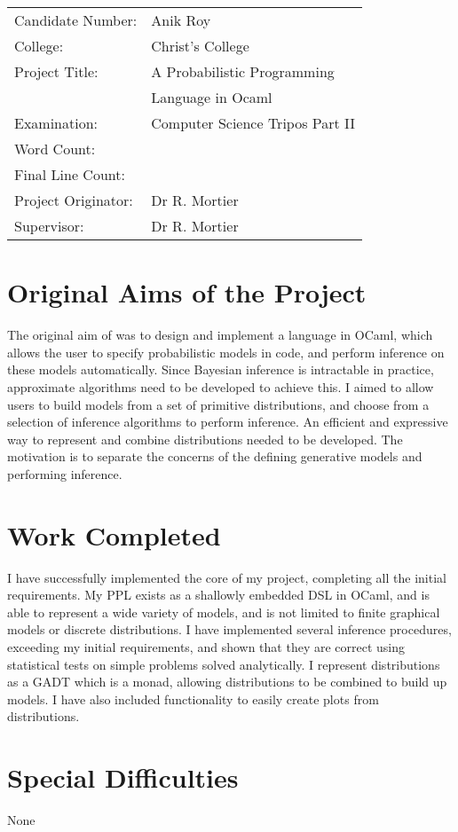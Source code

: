 \immediate{}
\immediate{}

{\large
\begin{tabular}{ll}
Candidate Number:   & Anik Roy\\
College:            & Christ's College\\
Project Title:      & A Probabilistic Programming\\
                    & Language in Ocaml\\
Examination:        & Computer Science Tripos Part II\\
Word Count:         & \footnotemark[1]\\
Final Line Count:   & \footnotemark[2]\\
Project Originator: & Dr R. Mortier\\
Supervisor:         & Dr R. Mortier\\ 
\end{tabular} 
}


\section*{Original Aims of the Project}

The original aim of was to design and implement a language in OCaml, which allows the user to specify probabilistic models in code, and perform inference on these models automatically. Since Bayesian inference is intractable in practice, approximate algorithms need to be developed to achieve this. I aimed to allow users to build models from a set of primitive distributions, and choose from a selection of inference algorithms to perform inference. An efficient and expressive way to represent and combine distributions needed to be developed. The motivation is to separate the concerns of the defining generative models and performing inference.

\section*{Work Completed}
I have successfully implemented the core of my project, completing all the initial requirements. My PPL exists as a shallowly embedded DSL in OCaml, and is able to represent a wide variety of models, and is not limited to finite graphical models or discrete distributions. I have implemented several inference procedures, exceeding my initial requirements, and shown that they are correct using statistical tests on simple problems solved analytically. I represent distributions as a GADT which is a monad, allowing distributions to be combined to build up models. I have also included functionality to easily create plots from distributions.


\section*{Special Difficulties}
None
